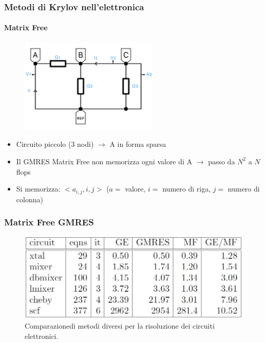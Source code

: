 \documentclass[10pt]{beamer}
\begin{document}
\begin{frame}\frametitle{Metodi di Krylov nell'elettronica}\framesubtitle{\textbf{Matrix Free}}

\begin{figure}
    \includegraphics[width=.90\linewidth,height=4.5cm,keepaspectratio]{my_circuit.png}
\end{figure}


\begin{itemize}
\item Circuito piccolo (3 nodi) $\to$ A in forma sparsa
\item Il GMRES Matrix Free non memorizza ogni valore di A $\to$ passo da $N^2$ a $N$ flops
\item Si memorizza: $<a_{i,j}, i, j>$  ($a =$ valore, $i =$ numero di riga, $j =$ numero di colonna)

\end{itemize}
\end{frame}

\begin{frame} \frametitle{Matrix Free GMRES}
\begin{figure}
    \centering
    \includegraphics[width=.75\linewidth]{Tabella1.JPG}
    \caption{Comparazione\footnotemark di metodi diversi per la risoluzione dei circuiti elettronici.}
\end{figure}
\end{frame}
\end{document}

